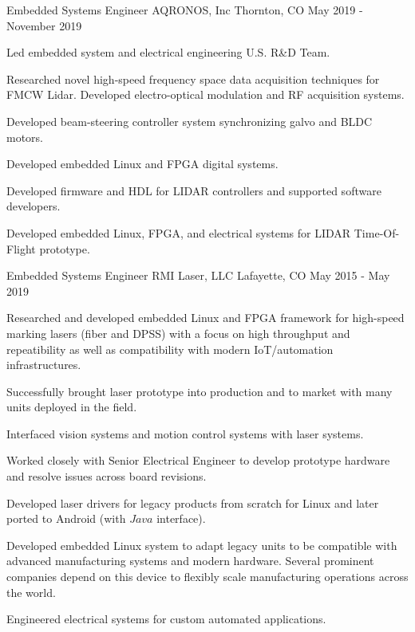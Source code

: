 \begin{cventries}
  \cventry
    {Embedded Systems Engineer} %
    {AQRONOS, Inc} %
    {Thornton, CO} %
    {May 2019 - November 2019} %
    {
      \begin{cvitems} %
        \item {
			Led embedded system and electrical engineering U.S. R\&D Team.
        }
        \item {
			Researched novel high-speed frequency space data acquisition techniques for FMCW Lidar. Developed electro-optical modulation and RF acquisition systems.
        }
        \item {
			Developed beam-steering controller system synchronizing galvo and BLDC motors.
        }
		\item {
			Developed embedded Linux and FPGA digital systems.
		}
		\item {
			Developed firmware and HDL for LIDAR controllers and supported software developers.
		}
		\item {
			Developed embedded Linux, FPGA, and electrical systems for LIDAR Time-Of-Flight prototype.
		}
      \end{cvitems}
    }
  \cventry
    {Embedded Systems Engineer} %
    {RMI Laser, LLC} %
    {Lafayette, CO} %
    {May 2015 - May 2019} %
    {
      \begin{cvitems} %
        \item {
            Researched and developed embedded Linux and FPGA framework for high-speed
            marking lasers (fiber and DPSS) with a focus on high
			\linebreak
			throughput and repeatibility as well as compatibility with modern IoT/automation infrastructures.
        }
        \item {
            Successfully brought laser prototype into production and to market with many
            units deployed in the field.
        }
        \item {
            Interfaced vision systems and motion control systems with laser systems.
        }
        \item {
            Worked closely with Senior Electrical Engineer to develop prototype hardware
            and resolve issues across board revisions.
        }
        \item {
            Developed laser drivers for legacy products from scratch for Linux and later
            ported to Android (with $Java$ interface).
        }
        \item {
            Developed embedded Linux system to adapt legacy units to be compatible with
            advanced manufacturing systems and modern hardware. Several prominent
            companies depend on this device to flexibly scale manufacturing operations
            across the world.
        }
        \item {
            Engineered electrical systems for custom automated applications.
        }
      \end{cvitems}
    }

\end{cventries}
